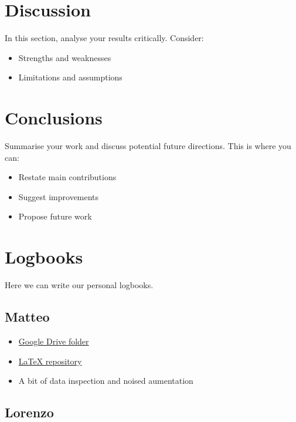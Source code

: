 \documentclass[11pt]{article}
\begin{document}
\begin{multicols*}{2}
        \section{Discussion}
        In this section, analyse your results critically. Consider:
        \begin{itemize}
            \item Strengths and weaknesses
            \item Limitations and assumptions
        \end{itemize}

        \section{Conclusions}
        Summarise your work and discuss potential future directions. This is where you can:
        \begin{itemize}
            \item Restate main contributions
            \item Suggest improvements
            \item Propose future work
        \end{itemize}

        \newpage

        \section{Logbooks}

        Here we can write our personal logbooks.

        \subsection{Matteo}

        \begin{itemize}
            \item \href{https://drive.google.com/drive/folders/1XqCxOkXIFV81NU8IlltS38bM65k9N-bR?usp=sharing}{Google Drive folder}
            \item \href{https://github.com/BonfaTex/DeepL-1}{\LaTeX{} repository}
            \item A bit of data inspection and noised aumentation
        \end{itemize}

        \subsection{Lorenzo}


\end{multicols*}
\end{document}
